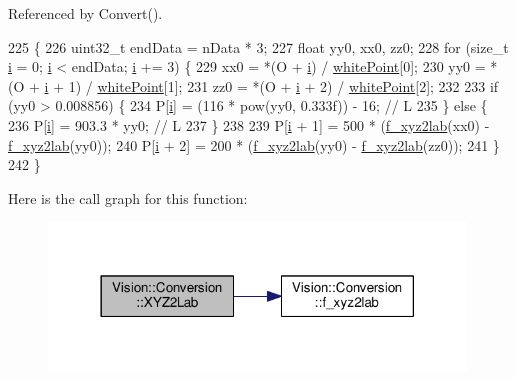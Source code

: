 Referenced by Convert().


\begin{DoxyCode}
225                                                       \{
226   uint32\_t endData = nData * 3;
227   \textcolor{keywordtype}{float} yy0, xx0, zz0;
228   \textcolor{keywordflow}{for} (\textcolor{keywordtype}{size\_t} \hyperlink{_comparision_pictures_2_createtest_image_8m_a6f6ccfcf58b31cb6412107d9d5281426}{i} = 0; \hyperlink{_comparision_pictures_2_createtest_image_8m_a6f6ccfcf58b31cb6412107d9d5281426}{i} < endData; \hyperlink{_comparision_pictures_2_createtest_image_8m_a6f6ccfcf58b31cb6412107d9d5281426}{i} += 3) \{
229     xx0 = *(O + \hyperlink{_comparision_pictures_2_createtest_image_8m_a6f6ccfcf58b31cb6412107d9d5281426}{i}) / \hyperlink{class_vision_1_1_conversion_adbaed406827f7ffb583d003815a9f3f8}{whitePoint}[0];
230     yy0 = *(O + \hyperlink{_comparision_pictures_2_createtest_image_8m_a6f6ccfcf58b31cb6412107d9d5281426}{i} + 1) / \hyperlink{class_vision_1_1_conversion_adbaed406827f7ffb583d003815a9f3f8}{whitePoint}[1];
231     zz0 = *(O + \hyperlink{_comparision_pictures_2_createtest_image_8m_a6f6ccfcf58b31cb6412107d9d5281426}{i} + 2) / \hyperlink{class_vision_1_1_conversion_adbaed406827f7ffb583d003815a9f3f8}{whitePoint}[2];
232 
233     \textcolor{keywordflow}{if} (yy0 > 0.008856) \{
234       P[\hyperlink{_comparision_pictures_2_createtest_image_8m_a6f6ccfcf58b31cb6412107d9d5281426}{i}] = (116 * pow(yy0, 0.333f)) - 16; \textcolor{comment}{// L}
235     \} \textcolor{keywordflow}{else} \{
236       P[\hyperlink{_comparision_pictures_2_createtest_image_8m_a6f6ccfcf58b31cb6412107d9d5281426}{i}] = 903.3 * yy0; \textcolor{comment}{// L}
237     \}
238 
239     P[\hyperlink{_comparision_pictures_2_createtest_image_8m_a6f6ccfcf58b31cb6412107d9d5281426}{i} + 1] = 500 * (\hyperlink{class_vision_1_1_conversion_aea73f90915cd0459dcaf70fb3e109a82}{f\_xyz2lab}(xx0) - \hyperlink{class_vision_1_1_conversion_aea73f90915cd0459dcaf70fb3e109a82}{f\_xyz2lab}(yy0));
240     P[\hyperlink{_comparision_pictures_2_createtest_image_8m_a6f6ccfcf58b31cb6412107d9d5281426}{i} + 2] = 200 * (\hyperlink{class_vision_1_1_conversion_aea73f90915cd0459dcaf70fb3e109a82}{f\_xyz2lab}(yy0) - \hyperlink{class_vision_1_1_conversion_aea73f90915cd0459dcaf70fb3e109a82}{f\_xyz2lab}(zz0));
241   \}
242 \}
\end{DoxyCode}


Here is the call graph for this function\+:\nopagebreak
\begin{figure}[H]
\begin{center}
\leavevmode
\includegraphics[width=314pt]{class_vision_1_1_conversion_a9ecc41c4226eafc55d0ee0cc550e593b_cgraph}
\end{center}
\end{figure}




